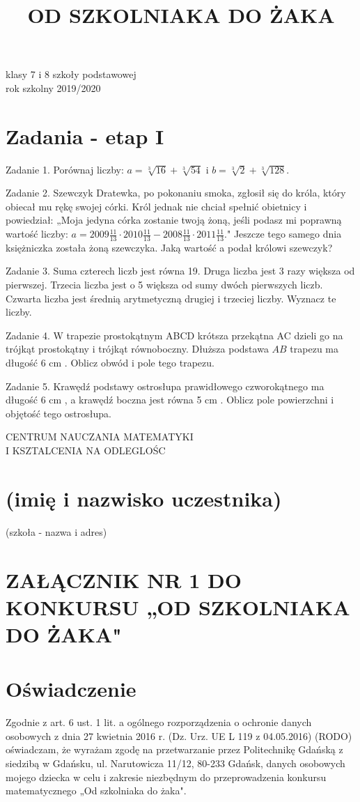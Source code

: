 \documentclass[10pt]{article}
\title{OD SZKOLNIAKA DO ŻAKA }
\author{}
\date{}
\begin{document}
\maketitle
klasy 7 i 8 szkoły podstawowej\\
rok szkolny 2019/2020

\section*{Zadania - etap I}
Zadanie 1. Porównaj liczby: \(a=\sqrt[3]{16}+\sqrt[3]{54}\) i \(b=\sqrt[3]{2}+\sqrt[3]{128}\).

Zadanie 2. Szewczyk Dratewka, po pokonaniu smoka, zgłosił się do króla, który obiecał mu rękę swojej córki. Król jednak nie chciał spełnić obietnicy i powiedział: „Moja jedyna córka zostanie twoją żoną, jeśli podasz mi poprawną wartość liczby: \(a=2009 \frac{11}{13} \cdot 2010 \frac{11}{13}-2008 \frac{11}{13} \cdot 2011 \frac{11}{13}\)." Jeszcze tego samego dnia księżniczka została żoną szewczyka. Jaką wartość a podał królowi szewczyk?

Zadanie 3. Suma czterech liczb jest równa 19. Druga liczba jest 3 razy większa od pierwszej. Trzecia liczba jest o 5 większa od sumy dwóch pierwszych liczb. Czwarta liczba jest średnią arytmetyczną drugiej i trzeciej liczby. Wyznacz te liczby.

Zadanie 4. W trapezie prostokątnym ABCD krótsza przekątna AC dzieli go na trójkąt prostokątny i trójkąt równoboczny. Dłuższa podstawa \(A B\) trapezu ma długość 6 cm . Oblicz obwód i pole tego trapezu.

Zadanie 5. Krawędź podstawy ostrosłupa prawidłowego czworokątnego ma długość 6 cm , a krawędź boczna jest równa 5 cm . Oblicz pole powierzchni i objętość tego ostrosłupa.

CENTRUM NAUCZANIA MATEMATYKI\\
I KSZTALCENIA NA ODLEGLOŚC

\section*{(imię i nazwisko uczestnika)}
\(\qquad\)\\
(szkoła - nazwa i adres)

\section*{ZAŁĄCZNIK NR 1 DO KONKURSU „OD SZKOLNIAKA DO ŻAKA"}
\section*{Oświadczenie}
Zgodnie z art. 6 ust. 1 lit. a ogólnego rozporządzenia o ochronie danych osobowych z dnia 27 kwietnia 2016 r. (Dz. Urz. UE L 119 z 04.05.2016) (RODO) oświadczam, że wyrażam zgodę na przetwarzanie przez Politechnikę Gdańską z siedzibą w Gdańsku, ul. Narutowicza 11/12, 80-233 Gdańsk, danych osobowych mojego dziecka w celu i zakresie niezbędnym do przeprowadzenia konkursu matematycznego „Od szkolniaka do żaka".
\end{document}
